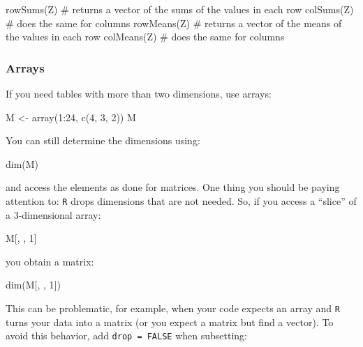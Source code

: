 \documentclass[
  letterpaper,
  DIV=11,
  numbers=noendperiod]{scrreprt}
\newenvironment{Shaded}{\begin{snugshade}}{\end{snugshade}}
\newcommand{\NormalTok}[1]{\textcolor[rgb]{0.00,0.23,0.31}{#1}}
\begin{document}
\begin{Shaded}
\begin{Highlighting}[]
\NormalTok{rowSums(Z) \# returns a vector of the sums of the values in each row}
\NormalTok{colSums(Z) \# does the same for columns}
\NormalTok{rowMeans(Z) \# returns a vector of the means of the values in each row}
\NormalTok{colMeans(Z) \# does the same for columns}
\end{Highlighting}
\end{Shaded}

\subsubsection*{Arrays}\label{arrays}

If you need tables with more than two dimensions, use arrays:

\begin{Shaded}
\begin{Highlighting}[]
\NormalTok{M \textless{}{-} array(1:24, c(4, 3, 2))}
\NormalTok{M }
\end{Highlighting}
\end{Shaded}

You can still determine the dimensions using:

\begin{Shaded}
\begin{Highlighting}[]
\NormalTok{dim(M)}
\end{Highlighting}
\end{Shaded}

and access the elements as done for matrices. One thing you should be
paying attention to: \texttt{R} drops dimensions that are not needed.
So, if you access a ``slice'' of a 3-dimensional array:

\begin{Shaded}
\begin{Highlighting}[]
\NormalTok{M[, , 1]}
\end{Highlighting}
\end{Shaded}

you obtain a matrix:

\begin{Shaded}
\begin{Highlighting}[]
\NormalTok{dim(M[, , 1])}
\end{Highlighting}
\end{Shaded}

This can be problematic, for example, when your code expects an array
and \texttt{R} turns your data into a matrix (or you expect a matrix but
find a vector). To avoid this behavior, add \texttt{drop\ =\ FALSE} when
subsetting:
\end{document}
